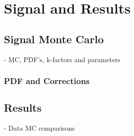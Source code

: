 \chapter{Signal and Results}


\section{Signal Monte Carlo}
{\normalsize - MC, PDF's, k-factors and parameters}

\subsection{PDF and Corrections}

\section{Results}
{\normalsize - Data MC comparisons}

